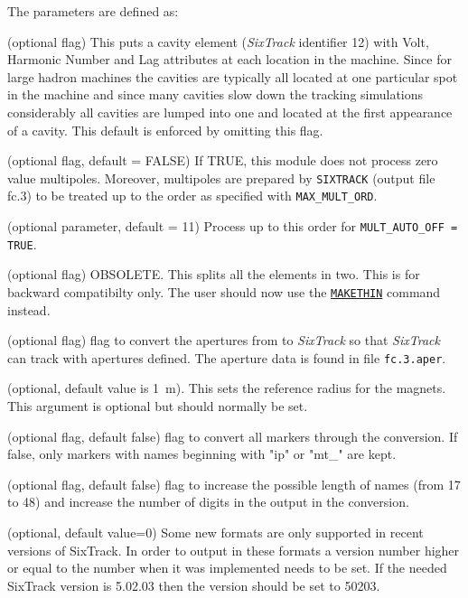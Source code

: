 The parameters are defined as: 
\begin{madlist}
    (optional flag) This puts a cavity element
   (\textit{SixTrack} identifier 12) with Volt, Harmonic Number and Lag
   attributes at each location in the machine. Since for large hadron
   machines the cavities are typically all located at one particular
   spot in the machine and since many cavities slow down the tracking
   simulations considerably all cavities are lumped into one and located
   at the first appearance of a cavity. This default is enforced by
   omitting this flag.  

    (optional flag, default = FALSE) If
   TRUE, this module does not process zero value multipoles. 
   Moreover, multipoles are prepared by \texttt{SIXTRACK}
   (output file fc.3) to be treated up to the order as specified with
   \texttt{MAX\_MULT\_ORD}.  

    (optional parameter, default = 11) Process up
   to this order for \texttt{MULT\_AUTO\_OFF = TRUE}.  

    (optional flag) OBSOLETE. This splits all the
   elements in  two. This is for backward compatibilty only. The user
   should now use the \hyperref[chap:makethin]{\texttt{MAKETHIN}} command
   instead.   

    (optional flag) flag to convert the apertures
   from \madx to \textit{SixTrack} so that \textit{SixTrack} can track
   with apertures defined. The aperture data is found in file
   \texttt{fc.3.aper}. 

    (optional, default value is 1~m). This sets the
   reference  radius for the magnets. This argument is optional but
   should normally be set. 

    (optional flag, default false) flag to convert all markers through the conversion. If false, only markers with names beginning with "ip" or "mt\_" are kept.

    (optional flag, default false) flag to increase the possible length of names (from 17 to 48) and increase the number of digits in the output in the conversion. 

    (optional, default value=0) Some new formats are only supported in recent versions of SixTrack. In order to output in these formats a version number higher or equal to the number when it was implemented needs to be set. If the needed SixTrack version is 5.02.03 then the version should be set to 50203.

\end{madlist}

